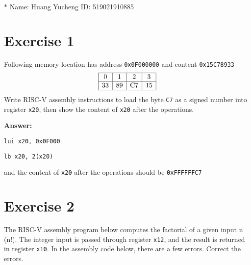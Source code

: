 \documentclass[11pt,a4paper]{article}
\begin{document}
\noindent{}

\begin{center}

\footnotesize{\color{blue}$*$ Name: Huang Yucheng ID: 519021910885}
\end{center}

\section*{Exercise 1}
Following memory location has address \verb|0x0F000000| and content \verb|0x15C78933|
$$
\begin{array}{|c|c|c|c|}
\hline 0 & 1 & 2 & \multicolumn{1}{c|}{3} \\
\hline 33 & 89 & \mathrm{C} 7 & 15 \\
\hline
\end{array}
$$
Write RISC-V assembly instructions to load the byte \verb|C7| as a signed number into register \verb|x20|, then show the content of \verb|x20| after the operations.


\vspace{0.3cm}

\textbf{Answer:}

\verb|lui x20, 0x0F000|

\verb|lb x20, 2(x20)|

and the content of \verb|x20| after the operations should be \verb|0xFFFFFFC7|

\section*{Exercise 2}
The RISC-V assembly program below computes the factorial of a given input $\mathrm{n}$ (n!). The integer input is passed through register \verb|x12|, and the result is returned in register \verb|x10|. In the assembly code below, there are a few errors. Correct the errors.
\end{document}

